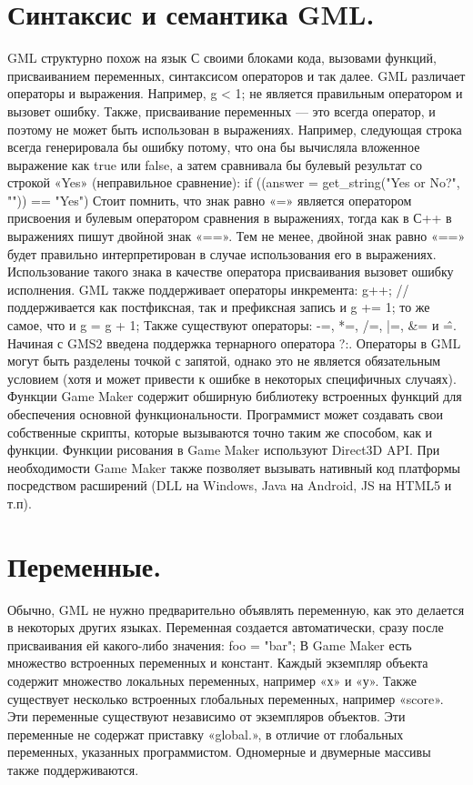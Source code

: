 \documentclass[14pt,article]{scrartcl}
\begin{document}
\section{Синтаксис и семантика GML.}
GML структурно похож на язык С своими блоками кода, вызовами функций, присваиванием переменных, синтаксисом операторов и так далее. GML различает операторы и выражения. Например,
g < 1;
не является правильным оператором и вызовет ошибку. Также, присваивание переменных — это всегда оператор, и поэтому не может быть использован в выражениях. Например, следующая строка всегда генерировала бы ошибку потому, что она бы вычисляла вложенное выражение как true или false, а затем сравнивала бы булевый результат со строкой «Yes» (неправильное сравнение):
if ((answer = get\_string("Yes or No?", "")) == "Yes")
Стоит помнить, что знак равно «=» является оператором присвоения и булевым оператором сравнения в выражениях, тогда как в С++ в выражениях пишут двойной знак «==». Тем не менее, двойной знак равно «==» будет правильно интерпретирован в случае использования его в выражениях. Использование такого знака в качестве оператора присваивания вызовет ошибку исполнения. GML также поддерживает операторы инкремента:
g++; // поддерживается как постфиксная, так и префиксная запись
и
g += 1;
то же самое, что и
g = g + 1;
Также существуют операторы: -=, *=, /=, |=, \&= и \^=. Начиная с GMS2 введена поддержка тернарного оператора ?:. Операторы в GML могут быть разделены точкой с запятой, однако это не является обязательным условием (хотя и может привести к ошибке в некоторых специфичных случаях).
Функции
Game Maker содержит обширную библиотеку встроенных функций для обеспечения основной функциональности. Программист может создавать свои собственные скрипты, которые вызываются точно таким же способом, как и функции. Функции рисования в Game Maker используют Direct3D API. При необходимости Game Maker также позволяет вызывать нативный код платформы посредством расширений (DLL на Windows, Java на Android, JS на HTML5 и т.п).

\section{Переменные.}
Обычно, GML не нужно предварительно объявлять переменную, как это делается в некоторых других языках. Переменная создается автоматически, сразу после присваивания ей какого-либо значения:
foo = "bar";
В Game Maker есть множество встроенных переменных и констант. Каждый экземпляр объекта содержит множество локальных переменных, например «х» и «у». Также существует несколько встроенных глобальных переменных, например «score». Эти переменные существуют независимо от экземпляров объектов. Эти переменные не содержат приставку «global.», в отличие от глобальных переменных, указанных программистом. Одномерные и двумерные массивы также поддерживаются.
\end{document}
